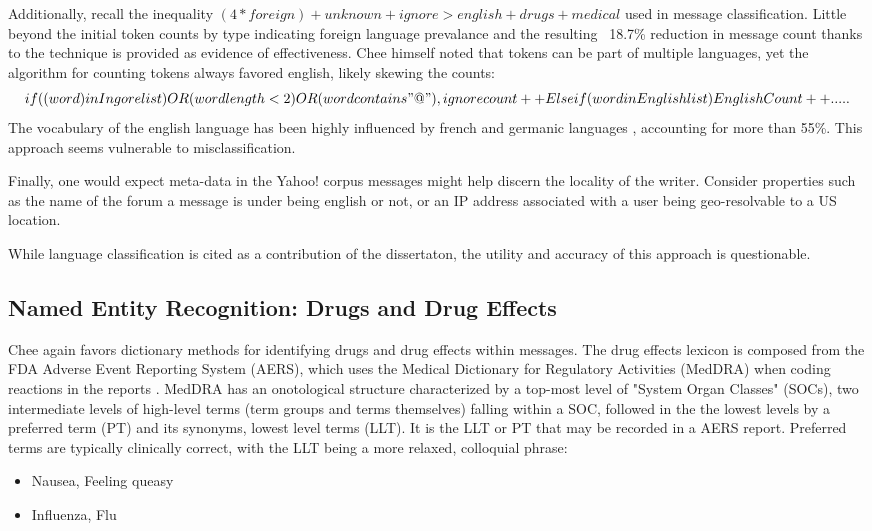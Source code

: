 \documentclass[twoside,11pt]{article}
\begin{document}
Additionally, recall the inequality $(4 * foreign) + unknown + ignore > english + drugs + medical$ used in message classification. Little beyond the initial token counts by type indicating foreign language prevalance and the resulting ~18.7\% reduction in message count thanks to the technique is provided as evidence of effectiveness. Chee himself noted that tokens can be part of multiple languages, yet the algorithm for counting tokens always favored english, likely skewing the counts:
\[
if ((word) in Ingore list) OR (word length < 2) OR (word contains "@"), ignore count ++
Else if (word in English list)
English Count++
.....
\]
The vocabulary of the english language has been highly influenced by french and germanic languages \citep{Wikipedia page for english}, accounting for more than 55\%. This approach seems vulnerable to misclassification.

Finally, one would expect meta-data in the Yahoo! corpus messages might help discern the locality of the writer. Consider properties such as the name of the forum a message is under being english or not, or an IP address associated with a user being geo-resolvable to a US location.

While language classification is cited as a contribution of the dissertaton, the utility and accuracy of this approach is questionable.


\subsection{Named Entity Recognition: Drugs and Drug Effects}
Chee again favors dictionary methods for identifying drugs and drug effects within messages. The drug effects lexicon is composed from the FDA Adverse Event Reporting System (AERS), which uses the Medical Dictionary for Regulatory Activities (MedDRA) when coding reactions in the reports \citep{FAERS}. MedDRA has an onotological structure characterized by a top-most level of "System Organ Classes" (SOCs), two intermediate levels of high-level terms (term groups and terms themselves) falling within a SOC, followed in the the lowest levels by a preferred term (PT) and its synonyms, lowest level terms (LLT). It is the LLT or PT that may be recorded in a AERS report. Preferred terms are typically clinically correct, with the LLT being a more relaxed, colloquial phrase:
\begin{itemize}
  \item Nausea,  Feeling queasy
  \item Influenza,  Flu
\end{itemize}
\end{document}
